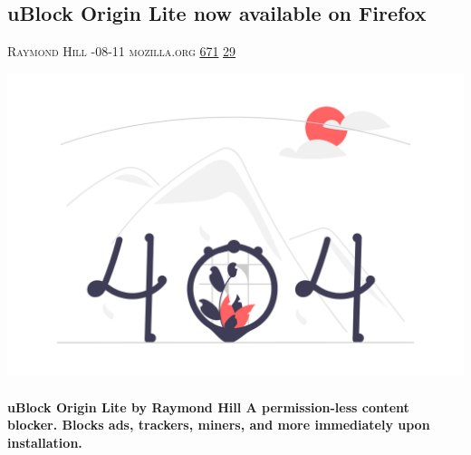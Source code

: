 \documentclass[10pt,a4paper]{article}
\begin{document}
\begin{multicols*}{2}

\noindent\begin{minipage}{\linewidth}
\subsection{uBlock Origin Lite now available on Firefox}
\textsc{\footnotesize
{\scriptsize\faUser}\space 
Raymond Hill 
{\scriptsize\faCalendar}-08-11 
{\scriptsize\faGlobe}\space 
mozilla.org 
{\scriptsize\faThumbsOUp}\space 
\href{http://news.ycombinator.com/item?id=37215557\&utm\_term=comment}{671} 
{\scriptsize\faComments}\space 
\href{http://news.ycombinator.com/item?id=37215557\&utm\_term=comment}{29} 
}
\par\medskip\noindent
\href{https://addons.mozilla.org/en-US/firefox/addon/ublock-origin-lite/?utm\_source=hackernewsletter\&utm\_medium=email\&utm\_term=show\_hn}{
    \includegraphics[width=0.99\linewidth]{notfound.png}
}
\end{minipage}
\paragraph{}
\textbf{uBlock Origin Lite by Raymond Hill
A permission-less content blocker. Blocks ads, trackers, miners, and more immediately upon installation.}
\paragraph{}


\end{multicols*}
\end{document}
